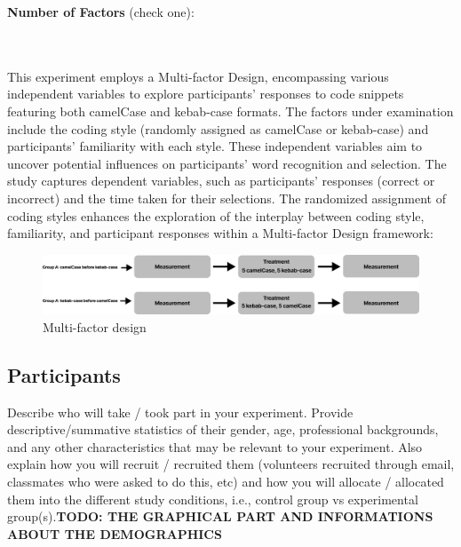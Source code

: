 \documentclass{article}
\begin{document}
\textbf{Number of Factors} (check one):\\
\noindent
\begin{minipage}{0.4\textwidth}
\end{minipage}%
\begin{minipage}{0.4\textwidth}
\end{minipage}%
\begin{minipage}{0.0\textwidth}
\end{minipage}\\\\
This experiment employs a Multi-factor Design, encompassing various independent variables to explore participants' responses to code snippets featuring both camelCase and kebab-case formats. The factors under examination include the coding style (randomly assigned as camelCase or kebab-case) and participants' familiarity with each style. These independent variables aim to uncover potential influences on participants' word recognition and selection. The study captures dependent variables, such as participants' responses (correct or incorrect) and the time taken for their selections. The randomized assignment of coding styles enhances the exploration of the interplay between coding style, familiarity, and participant responses within a Multi-factor Design framework:\\
\begin{figure}[H]
    \centering
    \includegraphics[width=1\textwidth]{graphExperiment2.png}
    \caption{Multi-factor design}
\end{figure}

\subsection{Participants}
Describe who will take / took part in your experiment. Provide descriptive/summative statistics of their gender, age, professional backgrounds, and any other characteristics that may be relevant to your experiment. Also explain how you will recruit / recruited them (volunteers recruited through email, classmates who were asked to do this, etc) and how you will allocate / allocated them into the different study conditions, i.e., control group vs experimental group(s).\textbf{TODO: THE GRAPHICAL PART AND INFORMATIONS ABOUT THE DEMOGRAPHICS}\\
\end{document}
